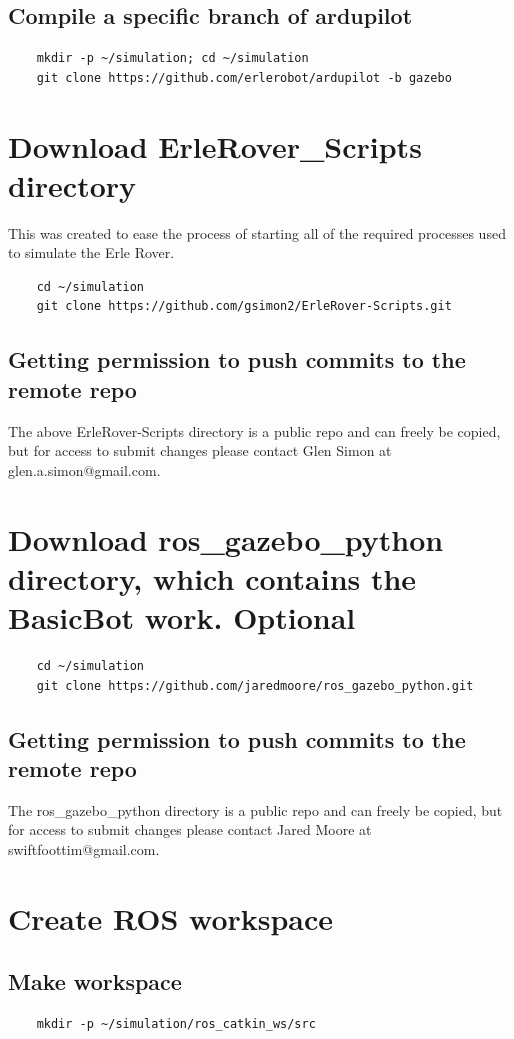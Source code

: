 \documentclass{report}
\begin{document}
\subsection{Compile a specific branch of ardupilot}
\begin{lstlisting}
	mkdir -p ~/simulation; cd ~/simulation
	git clone https://github.com/erlerobot/ardupilot -b gazebo
\end{lstlisting}

\section{Download ErleRover\_Scripts directory}
This was created to ease the process of starting all of the required processes used to simulate the Erle Rover.
\begin{lstlisting}
	cd ~/simulation
	git clone https://github.com/gsimon2/ErleRover-Scripts.git
\end{lstlisting}
\subsection{Getting permission to push commits to the remote repo}
The above ErleRover-Scripts directory is a public repo and can freely be copied, but for access to submit changes please contact Glen Simon at glen.a.simon@gmail.com.

\section{Download ros\_gazebo\_python directory, which contains the BasicBot work. Optional}
\begin{lstlisting}
	cd ~/simulation
	git clone https://github.com/jaredmoore/ros_gazebo_python.git
\end{lstlisting}
\subsection{Getting permission to push commits to the remote repo}
The ros\_gazebo\_python directory is a public repo and can freely be copied, but for access to submit changes please contact Jared Moore at swiftfoottim@gmail.com.



\section{Create ROS workspace}
\subsection{Make workspace}
\begin{lstlisting}
	mkdir -p ~/simulation/ros_catkin_ws/src
\end{lstlisting}
\end{document}
